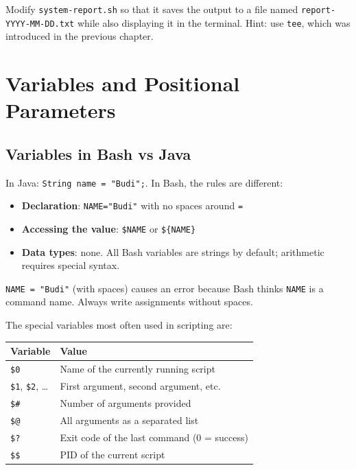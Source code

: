 \begin{exercisebox}[Exercise 9.1]
Modify \texttt{system-report.sh} so that it saves the output to a file named
\texttt{report-YYYY-MM-DD.txt} while also displaying it in the terminal.
Hint: use \texttt{tee}, which was introduced in the previous chapter.
\end{exercisebox}

\section{Variables and Positional Parameters}
\label{sec:variables-parameters}

\subsection*{Variables in Bash vs Java}

In Java: \texttt{String name = "Budi";}. In Bash, the rules are different:

\begin{itemize}
  \item \textbf{Declaration}: \texttt{NAME="Budi"} with no spaces around
    \texttt{=}
  \item \textbf{Accessing the value}: \texttt{\$NAME} or
    \texttt{\$\{NAME\}}
  \item \textbf{Data types}: none. All Bash variables are strings by
    default; arithmetic requires special syntax.
\end{itemize}

\begin{warningbox}
\texttt{NAME = "Budi"} (with spaces) causes an error because Bash thinks
\texttt{NAME} is a command name. Always write assignments without spaces.
\end{warningbox}

The special variables most often used in scripting are:

\begin{center}
\begin{tabular}{ll}
\hline
\textbf{Variable} & \textbf{Value} \\
\hline
\texttt{\$0} & Name of the currently running script \\
\texttt{\$1}, \texttt{\$2}, \ldots & First argument, second argument, etc. \\
\texttt{\$\#} & Number of arguments provided \\
\texttt{\$@} & All arguments as a separated list \\
\texttt{\$?} & Exit code of the last command (0 = success) \\
\texttt{\$\$} & PID of the current script \\
\hline
\end{tabular}
\end{center}

